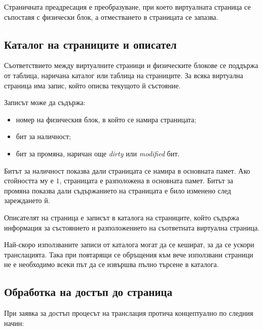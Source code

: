 \begin{defn}
Страничната преадресация е преобразуване, при което виртуалната страница се съпоставя с физически блок, а отместването в страницата се запазва.
\end{defn}

\subsection{Каталог на страниците и описател}\label{s:10.2.2}

Съответствието между виртуалните страници и физическите блокове се поддържа от таблица, наричана каталог или таблица на страниците. За всяка виртуална страница има запис, който описва текущото й състояние.

Записът може да съдържа:

\begin{itemize}
    \item номер на физическия блок, в който се намира страницата;
    \item бит за наличност;
    \item бит за промяна, наричан още \emph{dirty} или \emph{modified} бит.
\end{itemize}

Битът за наличност показва дали страницата се намира в основната памет. Ако стойността му е $1$, страницата е разположена в основната памет. Битът за промяна показва дали съдържанието на страницата е било изменено след зареждането й.

\begin{defn}
Описателят на страница е записът в каталога на страниците, който съдържа информация за състоянието и разположението на съответната виртуална страница.
\end{defn}

Най-скоро използваните записи от каталога могат да се кешират, за да се ускори транслацията. Така при повтарящи се обръщения към вече използвани страници не е необходимо всеки път да се извършва пълно търсене в каталога.

\subsection{Обработка на достъп до страница}\label{s:10.2.3}

При заявка за достъп процесът на транслация протича концептуално по следния начин:

